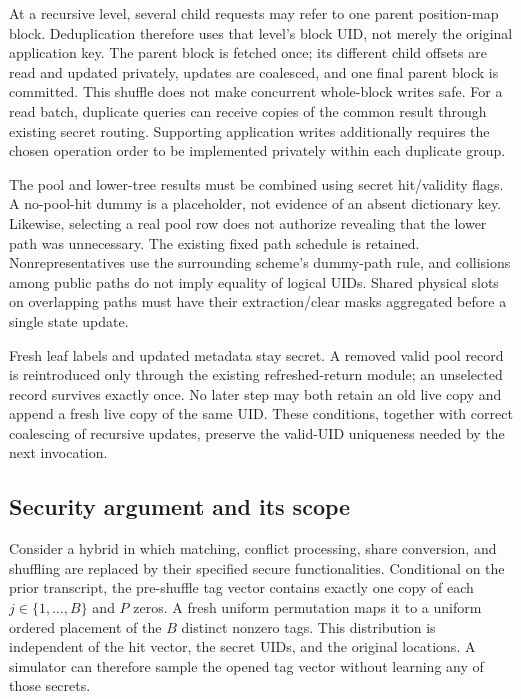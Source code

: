 At a recursive level, several child requests may refer to one parent
position-map block.  Deduplication therefore uses that level's block UID,
not merely the original application key.  The parent block is fetched once;
its different child offsets are read and updated privately, updates are
coalesced, and one final parent block is committed.  This shuffle does not
make concurrent whole-block writes safe.  For a read batch, duplicate
queries can receive copies of the common result through existing secret
routing.  Supporting application writes additionally requires the chosen
operation order to be implemented privately within each duplicate group.

The pool and lower-tree results must be combined using secret hit/validity
flags.  A no-pool-hit dummy is a placeholder, not evidence of an absent
dictionary key.  Likewise, selecting a real pool row does not authorize
revealing that the lower path was unnecessary.  The existing fixed path
schedule is retained.  Nonrepresentatives use the surrounding scheme's
dummy-path rule, and collisions among public paths do not imply equality
of logical UIDs.  Shared physical slots on overlapping paths must have
their extraction/clear masks aggregated before a single state update.

Fresh leaf labels and updated metadata stay secret.  A removed valid pool
record is reintroduced only through the existing refreshed-return module;
an unselected record survives exactly once.  No later step may both retain
an old live copy and append a fresh live copy of the same UID.  These
conditions, together with correct coalescing of recursive updates, preserve
the valid-UID uniqueness needed by the next invocation.

\subsection{Security argument and its scope}

Consider a hybrid in which matching, conflict processing, share conversion,
and shuffling are replaced by their specified secure functionalities.
Conditional on the prior transcript, the pre-shuffle tag vector contains
exactly one copy of each $j\in\{1,\ldots,B\}$ and $P$ zeros.  A fresh
uniform permutation maps it to a uniform ordered placement of the $B$
distinct nonzero tags.  This distribution is independent of the hit vector,
the secret UIDs, and the original locations.  A simulator can therefore
sample the opened tag vector without learning any of those secrets.

